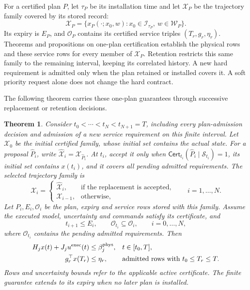 \documentclass[preprint,12pt]{elsarticle}
\newtheorem{theorem}{Theorem}
\begin{document}
For a certified plan $P$, let $\tau_P$ be its installation time and
let $\mathcal X_P$ be the trajectory family covered by its stored record:
\begin{equation}
\mathcal X_P=\{x_P(\cdot;x_0,w):
 x_0\in\mathcal I_{\tau_P},\ w\in\mathcal W_P\}.
\label{eq:execution-covered-family}
\end{equation}
Its expiry is $E_P$, and $\mathcal O_P$ contains its certified service
triples $(T_r,g_r,\eta_r)$. Theorems and propositions on one-plan
certification establish the physical rows and these service rows for every
member of $\mathcal X_P$. Retention restricts this same family to the
remaining interval, keeping its correlated history. A new hard requirement
is admitted only when the plan retained or installed covers it. A soft
priority request alone does not change the hard contract.

The following theorem carries these one-plan guarantees through successive
replacement or retention decisions.

\begin{theorem}
\label{thm:new-plan-closure}
Consider $t_0<\cdots<t_N<t_{N+1}=T$, including every plan-admission
decision and admission of a new service requirement on this finite
interval. Let $\mathcal X_0$ be the initial certified family, whose initial
set contains the actual state. For a proposal $\widehat P_i$, write
$\widehat{\mathcal X}_i=\mathcal X_{\widehat P_i}$. At $t_i$, accept it only when
$\mathsf{Cert}_{t_i}(\widehat P_i\mid\mathcal S_{t_i})=1$, its initial
set contains $x(t_i)$, and it covers all pending admitted requirements.
The selected trajectory family is
\begin{equation}
\mathcal X_i=\begin{cases}
\widehat{\mathcal X}_i,&\text{if the replacement is accepted},\\
\mathcal X_{i-1},&\text{otherwise},
\end{cases}\qquad i=1,\ldots,N.
\label{eq:execution-family-update}
\end{equation}
Let $P_i,E_i,\mathcal O_i$ be the plan, expiry and service rows stored
with this family. Assume the executed model, uncertainty and commands
satisfy its certificate, and
\[
t_{i+1}\le E_i,\qquad \mathcal O_{t_i}\subseteq\mathcal O_i,
\qquad i=0,\ldots,N,
\]
where $\mathcal O_{t_i}$ contains the pending admitted requirements.
Then
\begin{equation}
\begin{aligned}
H_jx(t)+J_ju^{\rm exec}(t)&\le\beta_j^{\rm phys},
 &&t\in[t_0,T],\\
g_r^\top x(T_r)&\le\eta_r,
 &&\text{admitted rows with }t_0\le T_r\le T.
\end{aligned}
\label{eq:execution-physical-service}
\end{equation}
Rows and uncertainty bounds refer to the applicable active certificate.
The finite guarantee extends to its expiry when no later plan is installed.
\end{theorem}
\end{document}
